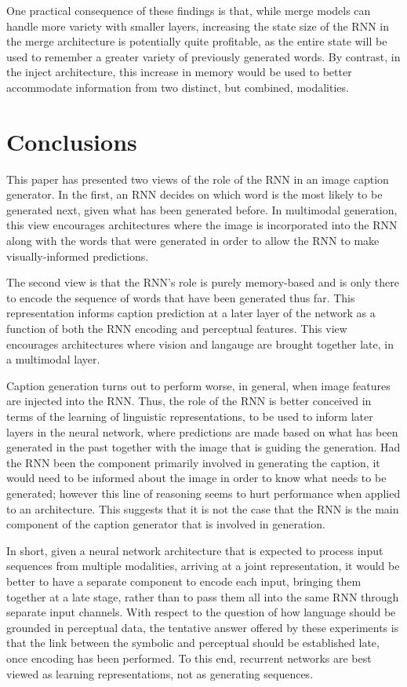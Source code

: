 \documentclass[11pt,letterpaper]{article}
\begin{document}
One practical consequence of these findings is that, while merge models can handle more variety with smaller layers, increasing the state size of the RNN in the merge architecture is potentially quite profitable, as the entire state will be used to remember a greater variety of previously generated words. By contrast, in the inject architecture, this increase in memory would be used to better accommodate information from two distinct, but combined, modalities.

\section{Conclusions}

This paper has presented two views of the role of the RNN in an image caption generator. In the first, an RNN decides on which word is the most likely to be generated next, given what has been generated before. In multimodal generation, this view encourages architectures where the image is incorporated into the RNN along with the words that were generated in order to allow the RNN to make visually-informed predictions. 

The second view is that the RNN's role is purely memory-based and is only there to encode the sequence of words that have been generated thus far. This representation informs caption prediction at a later layer of the network as a function of both the RNN encoding and perceptual features.
This view encourages architectures where vision and langauge are brought together late, in a multimodal layer.

Caption generation turns out to perform worse, in general, when image features are injected into the RNN. Thus, the role of the RNN is better conceived in terms of the learning of linguistic representations, to be used to inform later layers in the neural network, where predictions are made based on what has been generated in the past together with the image that is guiding the generation. Had the RNN been the component primarily involved in generating the caption, it would need to be informed about the image in order to know what needs to be generated; however this line of reasoning seems to hurt performance when applied to an architecture. This suggests that it is not the case that the RNN is the main component of the caption generator that is involved in generation.

In short, given a neural network architecture that is expected to process input sequences from multiple modalities, arriving at a joint representation, it would be better to have a separate component to encode each input, bringing them together at a late stage, rather than to pass them all into the same RNN through separate input channels. With respect to the question of how language should be grounded in perceptual data, the tentative answer offered by these experiments is that the link between the symbolic and perceptual should be established late, once encoding has been performed. To this end, recurrent networks are best viewed as learning representations, not as generating sequences.
\end{document}
